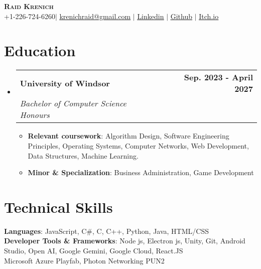 \documentclass[letterpaper,11pt]{article}
\makeatletter
\newcommand{\resumeItem}[1]{
  \item\small{
    {#1 \vspace{-2pt}}
  }
}
\newcommand{\resumeSubheading}[4]{
  \vspace{-2pt}\item
    \begin{tabular*}{0.97\textwidth}[t]{l@{\extracolsep{\fill}}r}
      \textbf{#1} & #2 \\
      \textit{\small#3} & \textit{\small #4} \\
    \end{tabular*}\vspace{-7pt}
}
\newcommand{\resumeSubHeadingListStart}{\begin{itemize}[leftmargin=0.15in, label={}]}
\newcommand{\resumeSubHeadingListEnd}{\end{itemize}}
\newcommand{\resumeItemListStart}{\begin{itemize}}
\newcommand{\resumeItemListEnd}{\end{itemize}\vspace{-5pt}}
\makeatother
\begin{document}
\begin{center}
    \textbf{\Huge \scshape Raid Krenich} \\ \vspace{1pt}
    \small +1-226-724-6260$|$ \href{mailto:krenichraid@gmail.com}{\underline{krenichraid@gmail.com}} $|$ 
    \href{https://www.linkedin.com/in/raid-krenich-239208253/}{\underline{Linkedin}} $|$
    \href{https://github.com/Krenich09}{\underline{Github}} $|$
    \href{https://rq1d.itch.io/}{\underline{Itch.io}}
\end{center}

%


\section{Education}
  \resumeSubHeadingListStart
    \resumeSubheading
      {University of Windsor}{\textbf{Sep. 2023 - April 2027}}
      {Bachelor of Computer Science Honours}{}
        \resumeItemListStart{}
          \resumeItem{\textbf{Relevant coursework}: Algorithm Design, Software Engineering Principles, Operating Systems, Computer Networks, Web Development, Data Structures, Machine Learning.}
          \resumeItem{\textbf{Minor \& Specialization}: Business Administration, Game Development}
        \resumeItemListEnd
  \resumeSubHeadingListEnd

%
\section{Technical Skills}
 \begin{itemize}[leftmargin=0.15in, label={}]
    \small{\item{
     \textbf{Languages}{: JavaScript, C\#, C, C++, Python, Java, HTML/CSS} \\
     \textbf{Developer Tools \& Frameworks}{: Node js, Electron js, Unity, Git, Android Studio, Open AI, Google Gemini, Google Cloud, React.JS } \\
     \textbf{}{ Microsoft Azure Playfab, Photon Networking PUN2}
    }}
 \end{itemize}
\end{document}
